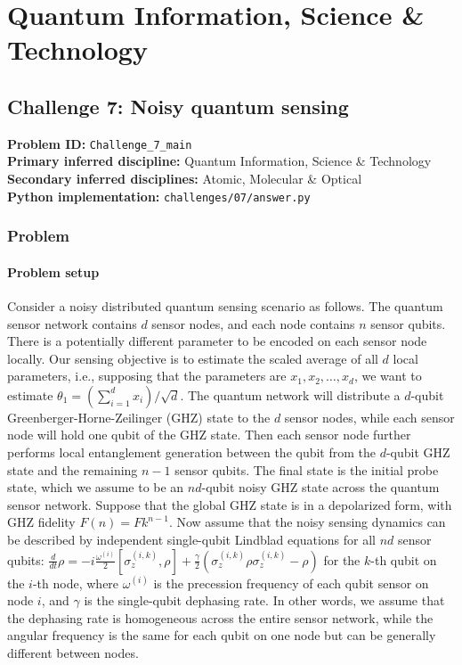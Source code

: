 \section{Quantum Information, Science \& Technology}
\subsection[Challenge 7: Noisy quantum sensing]{Challenge 7: Noisy quantum sensing}
\textbf{Problem ID:} \texttt{Challenge\_7\_main}\\
\textbf{Primary inferred discipline:} Quantum Information, Science \& Technology\\
\textbf{Secondary inferred disciplines:} Atomic, Molecular \& Optical\\
\textbf{Python implementation:} \texttt{challenges/07/answer.py}

\subsubsection*{Problem}
\paragraph*{Problem setup}

Consider a noisy distributed quantum sensing scenario as follows. The quantum sensor network contains $d$ sensor nodes, and each node contains $n$ sensor qubits. There is a potentially different parameter to be encoded on each sensor node locally. Our sensing objective is to estimate the scaled average of all $d$ local parameters, i.e., supposing that the parameters are $x_1, x_2, \dots, x_d$, we want to estimate $\theta_1 = (\sum_{i=1}^d x_i) / \sqrt{d}$. The quantum network will distribute a $d$-qubit Greenberger-Horne-Zeilinger (GHZ) state to the $d$ sensor nodes, while each sensor node will hold one qubit of the GHZ state. Then each sensor node further performs local entanglement generation between the qubit from the $d$-qubit GHZ state and the remaining $n-1$ sensor qubits. The final state is the initial probe state, which we assume to be an $nd$-qubit noisy GHZ state across the quantum sensor network. Suppose that the global GHZ state is in a depolarized form, with GHZ fidelity $F(n)=Fk^{n-1}$. Now assume that the noisy sensing dynamics can be described by independent single-qubit Lindblad equations for all $nd$ sensor qubits: $\frac{d}{dt}\rho = -i\frac{\omega^{(i)}}{2}\left[\sigma_z^{(i,k)},\rho\right] + \frac{\gamma}{2}\left(\sigma_z^{(i,k)}\rho \sigma_z^{(i,k)} - \rho\right)$ for the $k$-th qubit on the $i$-th node, where $\omega^{(i)}$ is the precession frequency of each qubit sensor on node $i$, and $\gamma$ is the single-qubit dephasing rate. In other words, we assume that the dephasing rate is homogeneous across the entire sensor network, while the angular frequency is the same for each qubit on one node but can be generally different between nodes.

